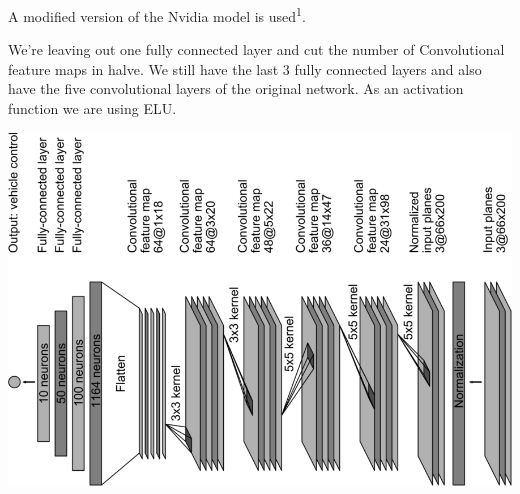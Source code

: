 \begin{multicols*}{2}
A modified version of the Nvidia model is used\textsuperscript{1}.

We're leaving out one fully connected layer and cut the number of Convolutional
feature maps in halve. We still have the last 3 fully connected layers and
 also have the five convolutional layers of the original network. As an activation function we are using ELU.
\begin{minipage}{0.25\textwidth}
 \centering
  \includegraphics[width=0.75\linewidth, height=0.1\linewidth]{images/nvidia_architecture.png}
\end{minipage}
\end{multicols*}